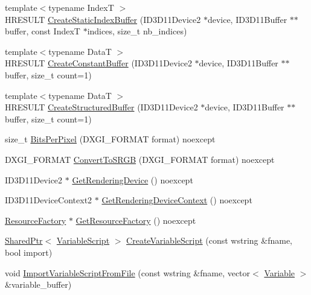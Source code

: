 \begin{DoxyCompactItemize}
\item 
{\footnotesize template$<$typename IndexT $>$ }\\H\+R\+E\+S\+U\+LT \hyperlink{namespacemage_a6d7b762686800ea46b6f56dbfa0727a2}{Create\+Static\+Index\+Buffer} (I\+D3\+D11\+Device2 $\ast$device, I\+D3\+D11\+Buffer $\ast$$\ast$buffer, const IndexT $\ast$indices, size\+\_\+t nb\+\_\+indices)
\item 
{\footnotesize template$<$typename DataT $>$ }\\H\+R\+E\+S\+U\+LT \hyperlink{namespacemage_a5eed34f604a40811bb0282dff7e6e712}{Create\+Constant\+Buffer} (I\+D3\+D11\+Device2 $\ast$device, I\+D3\+D11\+Buffer $\ast$$\ast$buffer, size\+\_\+t count=1)
\item 
{\footnotesize template$<$typename DataT $>$ }\\H\+R\+E\+S\+U\+LT \hyperlink{namespacemage_a9090692dded3dfa6abbcb2023b1e6327}{Create\+Structured\+Buffer} (I\+D3\+D11\+Device2 $\ast$device, I\+D3\+D11\+Buffer $\ast$$\ast$buffer, size\+\_\+t count=1)
\item 
size\+\_\+t \hyperlink{namespacemage_a7790d7143a44b49b6a05b86efaa680de}{Bits\+Per\+Pixel} (D\+X\+G\+I\+\_\+\+F\+O\+R\+M\+AT format) noexcept
\item 
D\+X\+G\+I\+\_\+\+F\+O\+R\+M\+AT \hyperlink{namespacemage_aaeeefa254fef15c66cc60bacd5a38c95}{Convert\+To\+S\+R\+GB} (D\+X\+G\+I\+\_\+\+F\+O\+R\+M\+AT format) noexcept
\item 
I\+D3\+D11\+Device2 $\ast$ \hyperlink{namespacemage_aa20b591269a1196de06bb1b8a6be5262}{Get\+Rendering\+Device} () noexcept
\item 
I\+D3\+D11\+Device\+Context2 $\ast$ \hyperlink{namespacemage_a5c2720129d998cd7202aacaa59d5054d}{Get\+Rendering\+Device\+Context} () noexcept
\item 
\hyperlink{classmage_1_1_resource_factory}{Resource\+Factory} $\ast$ \hyperlink{namespacemage_ab3a5bd404cc56d4c62c0b995a8daddbd}{Get\+Resource\+Factory} () noexcept
\item 
\hyperlink{namespacemage_a1e01ae66713838a7a67d30e44c67703e}{Shared\+Ptr}$<$ \hyperlink{classmage_1_1_variable_script}{Variable\+Script} $>$ \hyperlink{namespacemage_a4ee2d46e5220246892bb34b7d1e97fbe}{Create\+Variable\+Script} (const wstring \&fname, bool import)
\item 
void \hyperlink{namespacemage_a6ab176518e4d778ef8e28f2cfd63672a}{Import\+Variable\+Script\+From\+File} (const wstring \&fname, vector$<$ \hyperlink{structmage_1_1_variable}{Variable} $>$ \&variable\+\_\+buffer)
\item 
$$
\end{DoxyCompactItemize}
